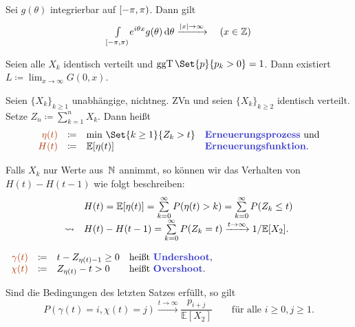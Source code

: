 \documentclass{cheat-sheet}
\newcommand{\E}{\mathbb{E}} %
\DeclareMathOperator{\ggT}{ggT} %
\newcommand{\Defn}[1]{\textcolor{DefinitionColor}{#1}}
\begin{document}
\begin{lem}
  Sei $g(\theta)$ integrierbar auf $\left[ -\pi, \pi \right)$.
  Dann gilt
  \[
    {\textstyle \int\limits_{\left[ -\pi, \pi \right)}^{}} e^{i \theta x} g(\theta) \,\mathrm{d} \theta \xrightarrow{\lvert x\rvert \to \infty}
    \quad (x \in \mathbb{Z})
  \]
\end{lem}

\begin{lem}
  \begin{minipage}[t]{0.8 \linewidth}
    Seien alle $X_k$ identisch verteilt und $\ggT \Set{p}{p_k > 0} = 1$.
    Dann existiert $L \coloneqq {\lim}_{x \to \infty} G(0, x)$.
  \end{minipage}
\end{lem}

\begin{defn}
  Seien $\{ X_k \}_{k \geq 1}$ unabhängige, nichtneg. ZVn und seien $\{ X_k \}_{k \geq 2}$ identisch verteilt.
  Setze $Z_n \coloneqq {\sum}_{k=1}^n X_k$.
  Dann heißt
  \[
    \begin{array}{r c l l}
      \Defn{\eta(t)} &\coloneqq& \min\,\Set{k \geq 1}{Z_k > t} &
      \text{\emph{Erneuerungsprozess} und} \\
      \Defn{H(t)} &\coloneqq& \E[\eta(t)]
      & \text{\emph{Erneuerungsfunktion}.}
    \end{array}
  \]
\end{defn}

Falls $X_k$ nur Werte aus~$\mathbb{N}$ annimmt, so können wir das Verhalten von $H(t) - H(t-1)$ wie folgt beschreiben:
\[\begin{array}{r l}
  & H(t) = \E[\eta(t)] = \sum_{k=0}^\infty P(\eta(t) > k) = \sum_{k=0}^\infty P(Z_k \leq t) \\
  \rightsquigarrow & H(t) - H(t-1) = \sum_{k=0}^\infty P(Z_k = t) \xrightarrow{t \to \infty} 1/\E[X_2].
\end{array}\]

\begin{defn}
  $
    \begin{array}[t]{r c l l}
    \Defn{\gamma(t)} &\coloneqq& t - Z_{\eta(t)-1} \geq 0 & \text{heißt \emph{Undershoot},} \\
    \Defn{\chi(t)} &\coloneqq& Z_{\eta(t)} - t > 0 & \text{heißt \emph{Overshoot}.}
    \end{array}
  $
\end{defn}

\begin{satz}
  Sind die Bedingungen des letzten Satzes erfüllt, so gilt
  \[
    P(\gamma(t)=i, \chi(t)=j) \xrightarrow{t \to \infty} \frac{p_{i+j}}{\E[X_2]}
    \qquad \text{für alle } i \geq 0, j \geq 1.
  \]
\end{satz}
\end{document}
